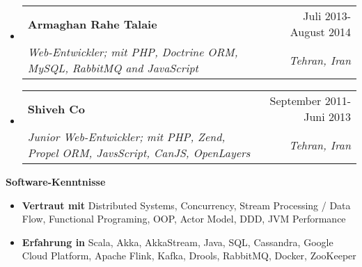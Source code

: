 \documentclass[letterpaper,12pt]{article}[leftmargin=*]
\makeatletter
\def \entryspacing {-0pt}
\renewcommand{\section}[2]{\vspace{5pt}
  \colorbox{secondary}{\color{white}\raggedbottom\normalsize\textbf{{#1}{\hspace{7pt}#2}}}
}
\newcommand{\resumeEntryStart}{\begin{itemize}[leftmargin=2.5mm]}
\newcommand{\resumeEntryEnd}{\end{itemize}\vspace{\entryspacing}}
\newcommand{\resumeEntryTSDL}[4]{
  \vspace{-1pt}\item[]
    \begin{tabular*}{0.97\textwidth}{l@{\extracolsep{\fill}}r}
      \textbf{\color{primary}#1} & {\firabook\color{accent}\small#2} \\
      \textit{\color{accent}\small#3} & \textit{\color{accent}\small#4} \\
    \end{tabular*}\vspace{-6pt}
}
\newcommand{\resumeEntryS}[2]{
  \item[]\small{
    \textbf{\color{primary}#1 }{ #2 \vspace{-6pt}}
  }
}
\makeatother
\begin{document}
\vspace{-13pt} %

  \resumeEntryStart
    \resumeEntryTSDL
      {Armaghan Rahe Talaie}{Juli 2013- August 2014}
      {Web-Entwickler; mit PHP, Doctrine ORM, MySQL, RabbitMQ and JavaScript}{Tehran, Iran}
  \resumeEntryEnd

\vspace{-13pt} %

  \resumeEntryStart
    \resumeEntryTSDL
      {Shiveh Co}{September 2011- Juni 2013}
      {Junior Web-Entwickler; mit PHP, Zend, Propel ORM, JavsScript, CanJS, OpenLayers}{Tehran, Iran}
  \resumeEntryEnd

\section{\faPuzzlePiece}{Software-Kenntnisse}
	\resumeEntryStart
		\resumeEntryS{Vertraut mit} {Distributed Systems, Concurrency, Stream Processing / Data Flow, Functional Programing, OOP, Actor Model, DDD, JVM Performance}
		\resumeEntryS{Erfahrung in} {Scala, Akka, AkkaStream, Java, SQL, Cassandra, Google Cloud Platform, Apache Flink, Kafka, Drools, RabbitMQ, Docker, ZooKeeper}
	\resumeEntryEnd

\end{document}
